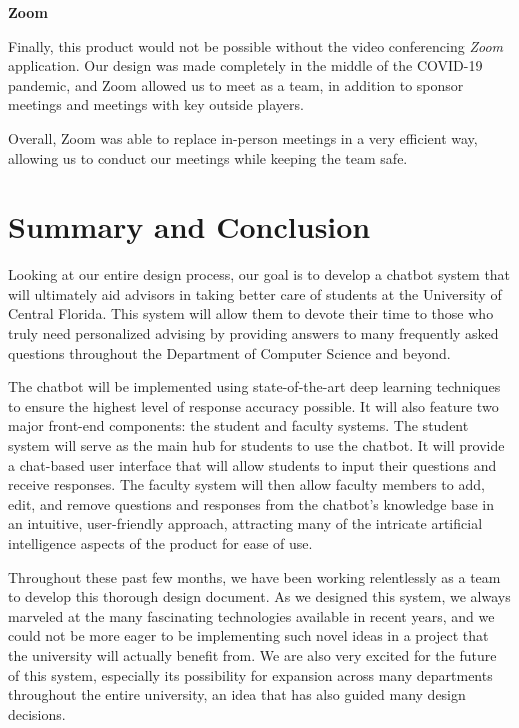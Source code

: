 \documentclass[titlepage, 12pt]{article}
\begin{document}
\textbf{Zoom}

Finally, this product would not be possible without the video conferencing \emph{Zoom} application. Our design was made completely in the middle of the COVID-19 pandemic, and Zoom allowed us to meet as a team, in addition to sponsor meetings and meetings with key outside players.

Overall, Zoom was able to replace in-person meetings in a very efficient way, allowing us to conduct our meetings while keeping the team safe.




















\pagebreak

\section{Summary and Conclusion}

Looking at our entire design process, our goal is to develop a chatbot system that will ultimately aid advisors in taking better care of students at the University of Central Florida. This system will allow them to devote their time to those who truly need personalized advising by providing answers to many frequently asked questions throughout the Department of Computer Science and beyond.

The chatbot will be implemented using state-of-the-art deep learning techniques to ensure the highest level of response accuracy possible. It will also feature two major front-end components: the student and faculty systems. The student system will serve as the main hub for students to use the chatbot. It will provide a chat-based user interface that will allow students to input their questions and receive responses. The faculty system will then allow faculty members to add, edit, and remove questions and responses from the chatbot’s knowledge base in an intuitive, user-friendly approach, attracting many of the intricate artificial intelligence aspects of the product for ease of use.

Throughout these past few months, we have been working relentlessly as a team to develop this thorough design document. As we designed this system, we always marveled at the many fascinating technologies available in recent years, and we could not be more eager to be implementing such novel ideas in a project that the university will actually benefit from. We are also very excited for the future of this system, especially its possibility for expansion across many departments throughout the entire university, an idea that has also guided many design decisions.
\end{document}
